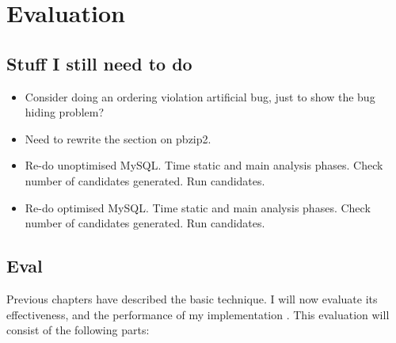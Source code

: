 \chapter{Evaluation}
\label{chapter:eval}

\section{Stuff I still need to do}

\begin{itemize}
\item Consider doing an ordering violation artificial bug, just to
  show the bug hiding problem?
\item Need to rewrite the section on pbzip2.
\item Re-do unoptimised MySQL.  Time static and main analysis phases.
  Check number of candidates generated.  Run candidates.
\item Re-do optimised MySQL.  Time static and main analysis phases.
  Check number of candidates generated.  Run candidates.
\end{itemize}

\section{Eval}

Previous chapters have described the basic {\technique} technique.  I
will now evaluate its effectiveness, and the performance of my
implementation {\implementation}.  This evaluation will consist of the
following parts:

